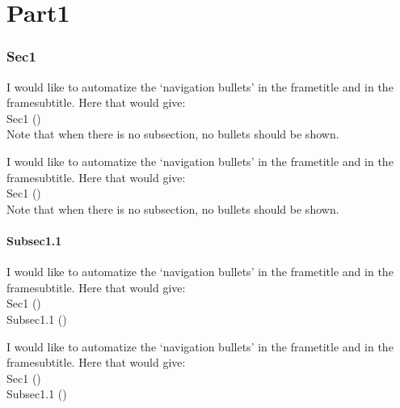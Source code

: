 \documentclass{beamer}
\begin{document}
\part{Part1}

\section{Sec1}

\begin{frame}
   I would like to automatize the `navigation bullets' in the frametitle and in the framesubtitle. Here that would give:\\[5mm]
   Sec1 (\textbullet\textopenbullet\textopenbullet\textopenbullet\textopenbullet)\\[5mm]

   \color{red}Note that when there is no subsection, no bullets should be shown.
\end{frame}

\begin{frame}
   I would like to automatize the `navigation bullets' in the frametitle and in the framesubtitle. Here that would give:\\[5mm]
   Sec1 (\textbullet\textbullet\textopenbullet\textopenbullet\textopenbullet)\\[5mm]

   \color{red}Note that when there is no subsection, no bullets should be shown.
\end{frame}

\subsection{Subsec1.1}

\begin{frame}
   I would like to automatize the `navigation bullets' in the frametitle and in the framesubtitle. Here that would give:\\[5mm]
   Sec1 (\textbullet\textbullet\textbullet\textopenbullet\textopenbullet)\\
   Subsec1.1 (\textbullet\textopenbullet)
\end{frame}

\begin{frame}
   I would like to automatize the `navigation bullets' in the frametitle and in the framesubtitle. Here that would give:\\[5mm]
   Sec1 (\textbullet\textbullet\textbullet\textbullet\textopenbullet)\\
   Subsec1.1 (\textbullet\textbullet)
\end{frame}
\end{document}
